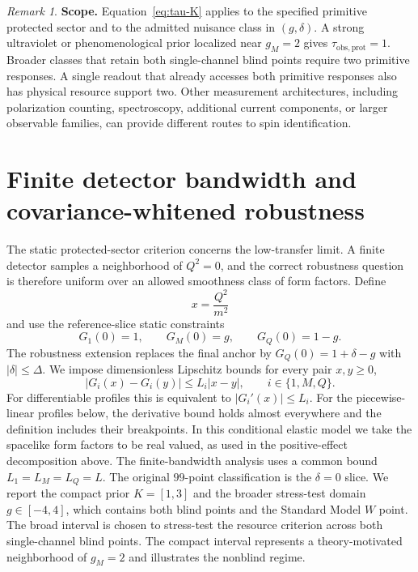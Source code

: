 \documentclass[12pt]{iopjournal}
\theoremstyle{definition}
\theoremstyle{remark}
\newtheorem{remark}{Remark}[section]
\begin{document}
\begin{remark}
\textbf{Scope.}
Equation~\eqref{eq:tau-K} applies to the specified primitive protected sector and to the admitted nuisance class in $(g,\delta)$. A strong ultraviolet or phenomenological prior localized near $g_M=2$ gives $\tau_{\mathrm{obs,prot}}=1$. Broader classes that retain both single-channel blind points require two primitive responses. A single readout that already accesses both primitive responses also has physical resource support two. Other measurement architectures, including polarization counting, spectroscopy, additional current components, or larger observable families, can provide different routes to spin identification.
\end{remark}

\section{Finite detector bandwidth and covariance-whitened robustness}
\label{sec:bandwidth}

The static protected-sector criterion concerns the low-transfer limit. A finite detector samples a neighborhood of $Q^2=0$, and the correct robustness question is therefore uniform over an allowed smoothness class of form factors. Define
\begin{equation}
x=\frac{Q^2}{m^2}
\end{equation}
and use the reference-slice static constraints
\begin{equation}
G_1(0)=1,\qquad G_M(0)=g,\qquad G_Q(0)=1-g.
\end{equation}
The robustness extension replaces the final anchor by $G_Q(0)=1+\delta-g$ with $|\delta|\le\Delta$. We impose dimensionless Lipschitz bounds for every pair $x,y\ge0$,
\begin{equation}
|G_i(x)-G_i(y)|\le L_i|x-y|,
\qquad i\in\{1,M,Q\}.
\label{eq:lipschitz}
\end{equation}
For differentiable profiles this is equivalent to $|G_i'(x)|\le L_i$. For the piecewise-linear profiles below, the derivative bound holds almost everywhere and the definition includes their breakpoints.
In this conditional elastic model we take the spacelike form factors to be real valued, as used in the positive-effect decomposition above. The finite-bandwidth analysis uses a common bound $L_1=L_M=L_Q=L$. The original $99$-point classification is the $\delta=0$ slice. We report the compact prior $K=[1,3]$ and the broader stress-test domain $g\in[-4,4]$, which contains both blind points and the Standard Model $W$ point. The broad interval is chosen to stress-test the resource criterion across both single-channel blind points. The compact interval represents a theory-motivated neighborhood of $g_M=2$ and illustrates the nonblind regime.
\end{document}
